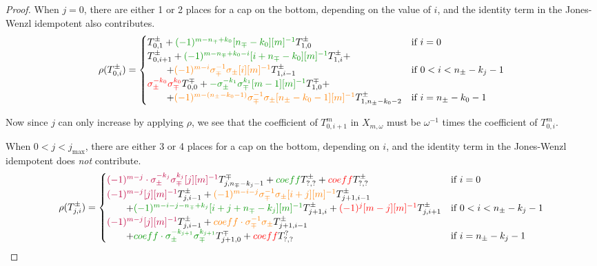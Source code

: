 \documentclass{article}
\begin{document}
\begin{proof}
When $j=0$, there are either 1 or 2 places for a cap on the bottom, depending on the value of $i$, and the identity term in the Jones-Wenzl idempotent also contributes.
$$
\rho(T^\pm_{0,i}) = 
\begin{cases}
T^\pm_{0,1}
+\textcolor{DarkGreen}{(-1)^{m-n_\mp+k_0}[n_\mp-k_0][m]^{-1}} T^\pm_{1,0}&\text{if $i=0$}
\\
T^\pm_{0,i+1}
+\textcolor{DarkGreen}{(-1)^{m-n_\mp+k_0-i}[i+n_\mp-k_0][m]^{-1}} T^\pm_{1,i} +
\\ \qquad + \textcolor{orange}{(-1)^{m-i} \sigma^{-1}_\mp\sigma_\pm [i][m]^{-1}} T^\pm_{1,i-1}
&\text{if }0 < i <n_\pm-k_j-1
\\
\textcolor{red}{\sigma_\pm^{-k_0} \sigma_\mp^{k_0}} T^\mp_{0,0}
+\textcolor{DarkGreen}{-\sigma_\pm^{-k_1} \sigma_\mp^{k_1} [m-1][m]^{-1} } T^\mp_{1,0} +
\\ \qquad +\textcolor{orange}{(-1)^{m-(n_\pm-k_0-1)} \sigma^{-1}_\mp\sigma_\pm [n_\pm-k_0-1][m]^{-1} } T^\pm_{1,n_\pm-k_0-2}
&\text{if } i = n_\pm-k_0-1
\end{cases}
$$

Now since $j$ can only increase by applying $\rho$, we see that the coefficient of $T^m_{0,i+1}$ in $X_{m,\omega}$ must be $\omega^{-1}$ times the coefficient of $T^m_{0,i}$.

When $0<j<j_{\text{max}}$, there are 
either 3 or 4 places for a cap on the bottom, depending on $i$, and the identity term in the Jones-Wenzl idempotent does \emph{not} contribute.
$$
\rho(T^\pm_{j,i}) = 
\begin{cases}
\textcolor{purple}{(-1)^{m-j}\cdot \sigma_\pm^{-k_j}\sigma_\mp^{k_j} [j][m]^{-1}} T^\mp_{j,n_\mp-k_j-1}
+\textcolor{DarkGreen}{coeff} T^\pm_{?,?}
+\textcolor{red}{coeff} T^\pm_{?,?}
&\text{if $i=0$}
\\
\textcolor{purple}{(-1)^{m-j}[j][m]^{-1}} T^\pm_{j,i-1}
+\textcolor{orange}{(-1)^{m-i-j} \sigma^{-1}_\mp\sigma_\pm [i+j][m]^{-1} } T^\pm_{j+1,i-1}
\\ \qquad
+\textcolor{DarkGreen}{(-1)^{m-i-j-n_{\mp}+k_j}[i+j+n_{\mp}-k_j][m]^{-1}} T^\pm_{j+1,i}
+\textcolor{red}{(-1)^j [m-j][m]^{-1}} T^\pm_{j,i+1}
&\text{if $0 < i <n_\pm-k_j-1$}
\\
\textcolor{purple}{(-1)^{m-j}[j][m]^{-1}} T^\pm_{j,i-1}
+\textcolor{orange}{coeff \cdot \sigma^{-1}_\mp\sigma_\pm} T^\pm_{j+1,i-1}
\\ \qquad
+\textcolor{DarkGreen}{coeff \cdot\sigma_\pm^{-k_{j+1}}\sigma_\mp^{k_{j+1}} } T^{\mp}_{j+1,0}
+\textcolor{red}{coeff} T^{?}_{?,?}
&\text{if  $i =n_\pm-k_j-1$}
\end{cases}
$$


\end{proof}
\end{document}
